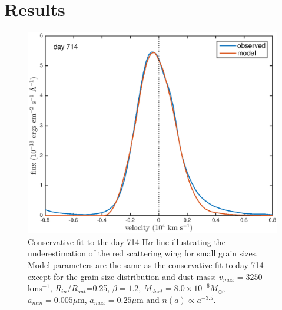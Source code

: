\documentclass[useAMS,usenatbib,usegraphicx]{mnras}
\begin{document}
\section{Results}
\label{results}

\begin{figure}
\begin{center}
\includegraphics[trim =37 10 45 15,clip=true,scale=0.51]{smooth/d714Ha_smooth_amC_MRN}
\caption{Conservative fit to the day 714 H$\alpha$ line illustrating the underestimation of the red scattering wing for small grain sizes.  Model parameters are the same as the conservative fit to day 714 except for the grain size distribution and dust mass:  $v_{max}=3250$ kms$^{-1}$, $R_{in}/R_{out}$=0.25, $\beta = 1.2$, $M_{dust}=8.0 \times 10^{-6} M_{\odot}$, $a_{min}=0.005 \mu$m, $a_{max}=0.25 \mu$m and $n(a) \propto a^{-3.5}$.}
\label{MRN}
\end{center}
\end{figure}
\end{document}

